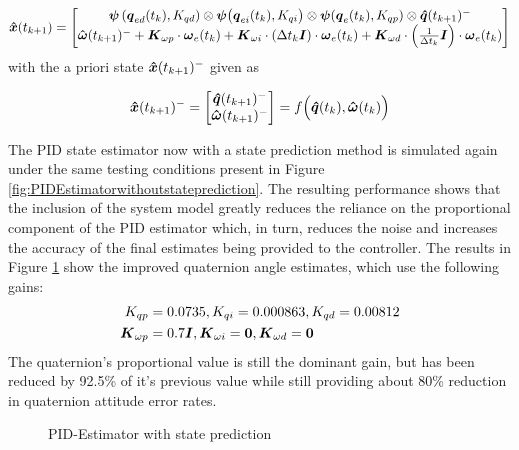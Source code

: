 \begin{equation}
  \boldsymbol{\hat{x}}(t_{k+1}) = \begin{bmatrix} \boldsymbol{\psi}\left(\boldsymbol{q}_{ed}(t_k), K_{qd}\right) \otimes \boldsymbol{\psi}\big(\boldsymbol{q}_{ei}(t_k), K_{qi}\big) \otimes \boldsymbol{\psi}(\boldsymbol{q}_e(t_{k}), K_{qp})  \otimes \boldsymbol{\hat{q}}(t_{k+1})^- \\
  \boldsymbol{\hat{\omega}}(t_{k+1})^- + \boldsymbol{K}_{\omega p} \cdot \boldsymbol{\omega}_e(t_{k}) + \boldsymbol{K}_{\omega i} \cdot (\Delta t_k \boldsymbol{I})\cdot \boldsymbol{\omega}_e(t_{k}) + \boldsymbol{K}_{\omega d} \cdot \left(\frac{1}{\Delta t_k} \boldsymbol{I}\right) \cdot \boldsymbol{\omega}_e(t_{k}) \end{bmatrix}
  \label{eqn:PIDEstimatorwithPredictionUnforcedMotion}
\end{equation}
with the a priori state $\boldsymbol{\hat{x}}(t_{k+1})^-$ given as

\begin{equation}
  \boldsymbol{\hat{x}}(t_{k+1})^- = \begin{bmatrix}\boldsymbol{\hat{q}}(t_{k+1})^- \\ \boldsymbol{\hat{\omega}}(t_{k+1})^- \end{bmatrix} = f \Big( \boldsymbol{\hat{q}}(t_{k}), \boldsymbol{\hat{\omega}}(t_{k}) \Big)
\end{equation}

The PID state estimator now with a state prediction method is simulated again under the same testing conditions present in Figure \ref{fig:PIDEstimatorwithoutstateprediction}.  The resulting performance shows that the inclusion of the system model greatly reduces the reliance on the proportional component of the PID estimator which, in turn, reduces the noise and increases the accuracy of the final estimates being provided to the controller.  The results in Figure \ref{fig:PIDEstimatorwithstateprediction} show the improved quaternion angle estimates, which use the following gains:
\begin{equation}
  \begin{aligned}
    K_{qp} &= 0.0735, K_{qi} = 0.000863, K_{qd} = 0.00812 \\
    \boldsymbol{K}_{\omega p} &= 0.7 \boldsymbol{I}, \boldsymbol{K}_{\omega i} = \boldsymbol{0}, \boldsymbol{K}_{\omega d} = \boldsymbol{0}
  \end{aligned}
\end{equation}
The quaternion's proportional value is still the dominant gain, but has been reduced by 92.5\% of it's previous value while still providing about 80\% reduction in quaternion attitude error rates.

\begin{figure}[H]
  \centerline{}
  \caption{PID-Estimator with state prediction}
  \label{fig:PIDEstimatorwithstateprediction}
\end{figure}

